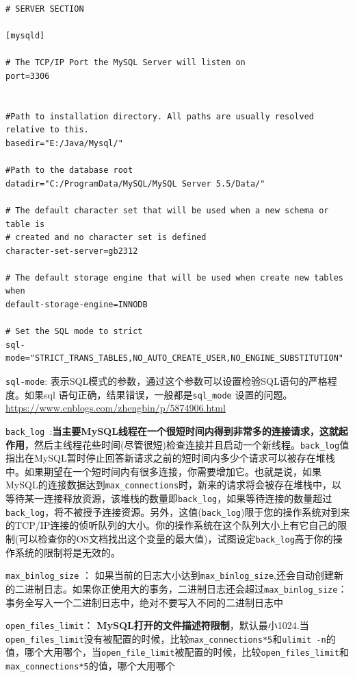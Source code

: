 \documentclass[UTF8,a4paper,12pt]{ctexbook}
\begin{document}
			\begin{lstlisting}
# SERVER SECTION

[mysqld]

# The TCP/IP Port the MySQL Server will listen on
port=3306


#Path to installation directory. All paths are usually resolved relative to this.
basedir="E:/Java/Mysql/"

#Path to the database root
datadir="C:/ProgramData/MySQL/MySQL Server 5.5/Data/"

# The default character set that will be used when a new schema or table is
# created and no character set is defined
character-set-server=gb2312

# The default storage engine that will be used when create new tables when
default-storage-engine=INNODB

# Set the SQL mode to strict
sql-mode="STRICT_TRANS_TABLES,NO_AUTO_CREATE_USER,NO_ENGINE_SUBSTITUTION"			
			\end{lstlisting}
		
		\verb|sql-mode|: 表示SQL模式的参数，通过这个参数可以设置检验SQL语句的严格程度。如果sql 语句正确，结果错误，一般都是\verb|sql_mode| 设置的问题。
		\url{https://www.cnblogs.com/zhengbin/p/5874906.html}
					
		\verb|back_log |:\textbf{当主要MySQL线程在一个很短时间内得到非常多的连接请求，这就起作用}，然后主线程花些时间(尽管很短)检查连接并且启动一个新线程。\verb|back_log|值指出在MySQL暂时停止回答新请求之前的短时间内多少个请求可以被存在堆栈中。如果期望在一个短时间内有很多连接，你需要增加它。也就是说，如果MySQL的连接数据达到\verb|max_connections|时，新来的请求将会被存在堆栈中，以等待某一连接释放资源，该堆栈的数量即\verb|back_log|，如果等待连接的数量超过\verb|back_log|，将不被授予连接资源。另外，这值(\verb|back_log|)限于您的操作系统对到来的TCP/IP连接的侦听队列的大小。你的操作系统在这个队列大小上有它自己的限制(可以检查你的OS文档找出这个变量的最大值)，试图设定\verb|back_log|高于你的操作系统的限制将是无效的。	
		
		
		\verb|max_binlog_size| ： 如果当前的日志大小达到\verb|max_binlog_size|,还会自动创建新的二进制日志。如果你正使用大的事务，二进制日志还会超过\verb|max_binlog_size|：事务全写入一个二进制日志中，绝对不要写入不同的二进制日志中
		
		
		\verb|open_files_limit|： \textbf{MySQL打开的文件描述符限制}，默认最小1024.当\verb|open_files_limit|没有被配置的时候，比较\verb|max_connections*5|和\verb|ulimit -n|的值，哪个大用哪个，当\verb|open_file_limit|被配置的时候，比较\verb|open_files_limit|和\verb|max_connections*5|的值，哪个大用哪个
		
\end{document}
